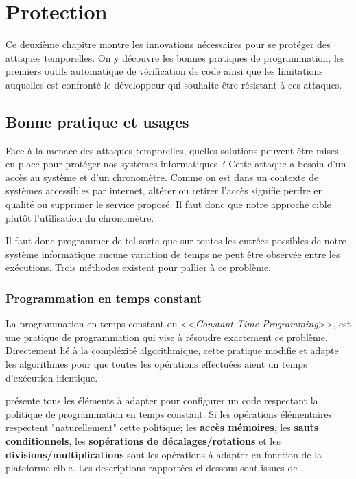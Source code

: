 \chapter{Protection}
\label{chap:constantTimeSolution}

Ce deuxième chapitre montre les innovations nécessaires pour se protéger des attaques temporelles. On y découvre les bonnes pratiques de programmation, les premiers outils automatique de vérification de code ainsi que les limitations auquelles est confronté le développeur qui souhaite être résistant à ces attaques.


\section{Bonne pratique et usages}

Face à la menace des attaques temporelles, quelles solutions peuvent être mises en place pour protéger nos systèmes informatiques ? Cette attaque a besoin d'un accès au système et d'un chronomètre. Comme on est dans un contexte de systèmes accessibles par internet, altérer ou retirer l'accès signifie perdre en qualité ou supprimer le service proposé. Il faut donc que notre approche cible plutôt l'utilisation du chronomètre.

Il faut donc programmer de tel sorte que sur toutes les entrées possibles de notre système informatique aucune variation de temps ne peut être observée entre les exécutions.
Trois méthodes existent pour pallier à ce problème.\medbreak

\subsection*{Programmation en temps constant}
La programmation en temps constant ou <<\textit{Constant-Time Programming}>>, est une pratique de programmation qui vise à résoudre exactement ce problème. Directement lié à la compléxité algorithmique, cette pratique modifie et adapte les algorithmes pour que toutes les opérations effectuées aient un temps d'exécution identique.

\citeauthor{BearSSL} \cite{BearSSL} présente tous les éléments à adapter pour configurer un code respectant la politique de programmation en temps constant. Si les opérations élémentaires respectent "naturellement" cette politique; les \textbf{accès mémoires}, les \textbf{sauts conditionnels}, les \textbf{sopérations de décalages/rotations} et les \textbf{divisions/multiplications} sont les opérations à adapter en fonction de la plateforme cible. Les descriptions rapportées ci-dessous sont issues de \cite{BearSSL}.\smallbreak

